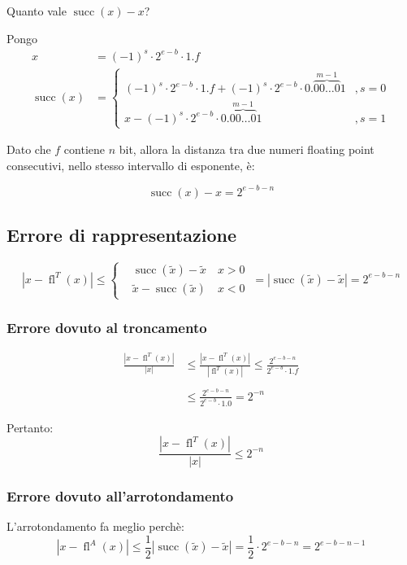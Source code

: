 \documentclass{article}
\begin{document}
Quanto vale $\operatorname{succ}(x)-x$?

Pongo
\begin{align*}
    x                      & = (-1)^s \cdot 2^{e-b} \cdot 1.f \\
    \operatorname{succ}(x) & =
    \begin{cases}
        (-1)^s \cdot 2^{e-b} \cdot 1.f + (-1)^s \cdot 2^{e-b} \cdot 0.\overbrace{00\dots0}^{m-1}1 & , s=0 \\
        x - (-1)^s \cdot 2^{e-b} \cdot 0.\overbrace{00\dots0}^{m-1}1                              & , s=1
    \end{cases}
\end{align*}

Dato che $f$ contiene $n$ bit, allora la distanza tra due numeri floating point consecutivi, nello stesso intervallo di esponente, è:

$$
    \boxed{
        \operatorname{succ}(x)-x
        =
        2^{e-b-n}
    }
$$

\subsection{Errore di rappresentazione}
$$
    |x-\operatorname{fl}^{T}(x)|
    \le
    \begin{cases}
         & \operatorname{succ}(\widetilde{x})-\widetilde{x}\quad x>0   \\
         & \widetilde{x} - \operatorname{succ}(\widetilde{x})\quad x<0
    \end{cases}
    \ =
    |\operatorname{succ}(\widetilde{x})-\widetilde{x}|
    =
    2^{e-b-n}
$$

\subsubsection{Errore dovuto al troncamento}

\begin{align*}
    \frac{\left|x-\operatorname{fl}^T(x)\right|}{|x|} & \le\frac{\left|x-\operatorname{fl}^T(x)\right|}{\left|\operatorname{fl}^T(x)\right|}\le\frac{2^{e-b-n}}{2^{e-b}\cdot1.f} \\\\
                                                      & \le\frac{2^{e-b-n}}{2^{e-b}\cdot1.0}=\boxed{2^{-n}}
\end{align*}

Pertanto:
$$
    \boxed{
        \frac{\left|x-\operatorname{fl}^{T}(x)\right|}{\left|x\right|}\le2^{-n}}
$$
\subsubsection{Errore dovuto all'arrotondamento}
L'arrotondamento fa meglio perchè:
$$
    \left|x-\operatorname{fl}^{A}(x)\right|
    \le
    \frac12
    \left|\operatorname{succ}(\widetilde{x})-\widetilde{x}\right|=\frac{1}{2}\cdot2^{e-b-n}=2^{e-b-n-1}
$$
\end{document}
